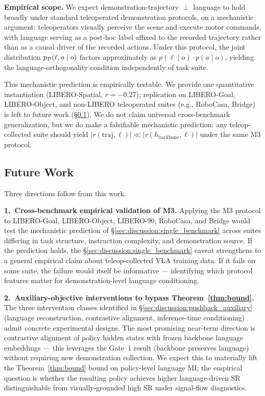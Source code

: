 \textbf{Empirical scope.} We expect demonstration-trajectory $\perp$ language to hold
broadly under standard teleoperated demonstration protocols, on a mechanistic argument:
teleoperators visually perceive the scene and execute motor commands, with language
serving as a post-hoc label affixed to the recorded trajectory rather than as a causal
driver of the recorded actions. Under this protocol, the joint distribution
$p_{\mathcal{D}}(\ell, a \mid o)$ factors approximately as $p(\ell \mid o) \cdot p(a \mid o)$,
yielding the language-orthogonality condition independently of task suite.

This mechanistic prediction is empirically testable. We provide one quantitative
instantiation (LIBERO-Spatial, $r = -0.27$); replication on LIBERO-Goal, LIBERO-Object,
and non-LIBERO teleoperated suites (e.g., RoboCasa, Bridge) is left to future work
(\S\ref{sec:discussion:future_work}). We do not claim universal cross-benchmark
generalization, but we do make a falsifiable mechanistic prediction: any teleop-collected
suite should yield $\lvert r(\text{traj}, \ell) \rvert \ll \lvert r(h_{\mathrm{backbone}},
\ell) \rvert$ under the same M3 protocol.

\subsection{Future Work}
\label{sec:discussion:future_work}

Three directions follow from this work.

\textbf{1.~Cross-benchmark empirical validation of M3.} Applying the M3 protocol to
LIBERO-Goal, LIBERO-Object, LIBERO-90, RoboCasa, and Bridge would test the mechanistic
prediction of \S\ref{sec:discussion:single_benchmark} across suites differing in task
structure, instruction complexity, and demonstration source. If the prediction holds, the
\S\ref{sec:discussion:single_benchmark} caveat strengthens to a general empirical claim
about teleop-collected VLA training data. If it fails on some suite, the failure would
itself be informative --- identifying which protocol features matter for
demonstration-level language conditioning.

\textbf{2.~Auxiliary-objective interventions to bypass Theorem~\ref{thm:bound}.} The
three intervention classes identified in \S\ref{sec:discussion:pushback_auxiliary}
(language reconstruction, contrastive alignment, inference-time conditioning) admit
concrete experimental designs. The most promising near-term direction is contrastive
alignment of policy hidden states with frozen backbone language embeddings --- this
leverages the Gate~1 result (backbone preserves language) without requiring new
demonstration collection. We expect this to materially lift the
Theorem~\ref{thm:bound} bound on policy-level language MI; the empirical question is
whether the resulting policy achieves higher language-driven SR distinguishable from
visually-grounded high SR under signal-flow diagnostics.

